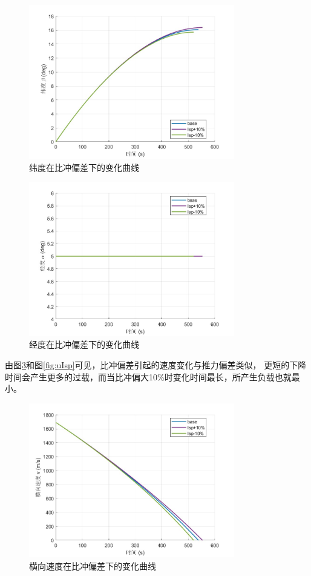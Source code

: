 \documentclass[12pt,a4paper]{article}
\begin{document}
\begin{figure}[H]
\centering
\includegraphics[width=0.8\textwidth]{figures/beta_Isp.jpg}
\caption{纬度在比冲偏差下的变化曲线}
\label{fig:betaIsp}
\end{figure}

\begin{figure}[H]
\centering
\includegraphics[width=0.8\textwidth]{figures/alpha_Isp.jpg}
\caption{经度在比冲偏差下的变化曲线}
\label{fig:alphaIsp}
\end{figure}

由图\ref{fig:vIsp}和图\ref{fig:uIsp}可见，比冲偏差引起的速度变化与推力偏差类似，
更短的下降时间会产生更多的过载，而当比冲偏大10\%时变化时间最长，所产生负载也就最小。

\begin{figure}[H]
\centering
\includegraphics[width=0.8\textwidth]{figures/v_Isp.jpg}
\caption{横向速度在比冲偏差下的变化曲线}
\label{fig:vIsp}
\end{figure}
\end{document}
